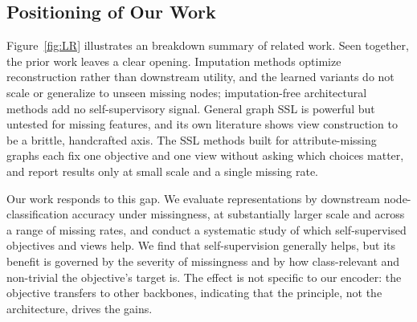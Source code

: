 \subsection{Positioning of Our Work}
\label{sec:related-positioning}

Figure~\ref{fig:LR} illustrates an breakdown summary of related work.
Seen together, the prior work leaves a clear opening. Imputation methods optimize reconstruction rather than downstream utility, and the learned variants do not scale or generalize to unseen missing nodes; imputation-free architectural methods add no self-supervisory signal. General graph SSL is powerful but untested for missing features, and its own literature shows view
construction to be a brittle, handcrafted axis. The SSL methods built for attribute-missing graphs each fix one objective and one view without asking which choices matter, and report results
only at small scale and a single missing rate.

Our work responds to this gap. We evaluate representations by downstream node-classification accuracy under missingness, at substantially larger scale and across a range of missing rates,
and conduct a systematic study of which self-supervised objectives and views help. We find that self-supervision generally helps, but its benefit is governed by the severity of missingness
and by how class-relevant and non-trivial the objective's target is. The effect is not specific to our encoder: the objective transfers to other backbones, indicating that the principle, not
the architecture, drives the gains.